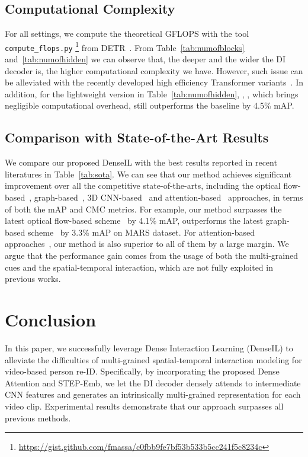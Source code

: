 \documentclass[10pt,twocolumn,letterpaper]{article}
\begin{document}
\subsection{Computational Complexity}

For all settings, we compute the theoretical GFLOPS with the tool \texttt{compute\_flops.py} \footnote{\url{https://gist.github.com/fmassa/c0fbb9fe7bf53b533b5cc241f5c8234c}} from DETR~\cite{carion2020end}. From Table~\ref{tab:numofblocks} and~\ref{tab:numofhidden} we can observe that, the deeper and the wider the DI decoder is, the higher computational complexity we have. However, such issue can be alleviated with the recently developed high efficiency Transformer variants~\cite{kitaev2019reformer,zhu2020deformable}. In addition, for the lightweight version in Table~\ref{tab:numofhidden}, \eg, , which brings negligible computational overhead, still outperforms the baseline by 4.5\% mAP.

\subsection{Comparison with State-of-the-Art Results}

We compare our proposed DenseIL with the best results reported in recent literatures in Table~\ref{tab:sota}. We can see that our method achieves significant improvement over all the competitive state-of-the-arts, including the optical flow-based~\cite{chen2020temporal}, graph-based~\cite{yang2020spatial,yan2020learning}, 3D CNN-based~\cite{li2019multi,gu2020appearance} and attention-based~\cite{fu2019sta,hou2019vrstc,li2019global,subramaniam2019co,hou2020temporal} approaches, in terms of both the mAP and CMC metrics. For example, our method surpasses the latest optical flow-based scheme~\cite{chen2020temporal} by 4.1\% mAP, outperforms the latest graph-based scheme~\cite{yang2020spatial} by 3.3\% mAP on MARS dataset. For attention-based approaches~\cite{li2019global,hou2020temporal}, our method is also superior to all of them by a large margin. We argue that the performance gain comes from the usage of both the multi-grained cues and the spatial-temporal interaction, which are not fully exploited in previous works.

\section{Conclusion}
In this paper, we successfully leverage Dense Interaction Learning (DenseIL) to alleviate the difficulties of multi-grained spatial-temporal interaction modeling for video-based person re-ID. Specifically, by incorporating the proposed Dense Attention and STEP-Emb, we let the DI decoder densely attends to intermediate CNN features and generates an intrinsically multi-grained representation for each video clip. Experimental results demonstrate that our approach surpasses all previous methods.
\end{document}

